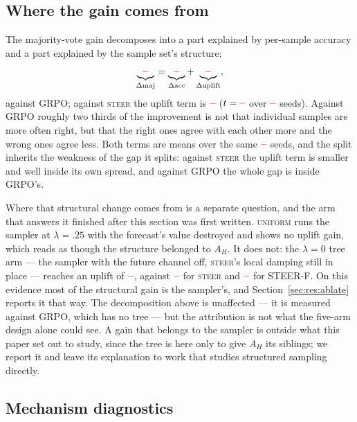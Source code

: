 \documentclass[11pt]{article}
\newcommand{\AH}{A_{H}}
\providecommand{\PENDING}{\textcolor{red}{\textbf{--}}}
\newcommand{\num}[1]{\ifcsname #1\endcsname\csname #1\endcsname\else\PENDING\fi}
\begin{document}
\subsection{Where the gain comes from}
\label{sec:res:decomp}

The majority-vote gain decomposes into a part explained by per-sample accuracy and a
part explained by the sample set's structure:
%
\begin{equation*}
\underbrace{\num{Csignedgrpomaj}}_{\Delta\mathrm{maj}}
=\underbrace{\num{Csignedgrpoacc}}_{\Delta\mathrm{acc}}
+\underbrace{\num{Csignedgrpouplift}}_{\Delta\mathrm{uplift}},
\end{equation*}
%
against GRPO; against \textsc{steer} the uplift term is
$\num{Csignedsteeruplift}$ ($t = \num{Tsignedsteeruplift}$ over
$\num{Nsignedsteer}$ seeds). Against GRPO roughly two thirds of the improvement is
not that individual samples are more often right, but that the right ones agree with
each other more and the wrong ones agree less. Both terms are
means over the same $\num{Nseedsused}$ seeds, and the split inherits the weakness of
the gap it splits: against \textsc{steer} the uplift term is smaller and well
inside its own spread, and against GRPO the whole gap is inside GRPO's.

Where that structural change comes from is a separate question, and the arm that
answers it finished after this section was first written. \textsc{uniform} runs the
sampler at $\lambda = .25$ with the forecast's value destroyed and shows no uplift
gain, which reads as though the structure belonged to $\AH$. It does not: the
$\lambda = 0$ tree arm --- the sampler with the future channel off, \textsc{steer}'s
local damping still in place --- reaches an uplift
of $\num{Rlamzerouplift}$, against $\num{Rsteeruplift}$ for \textsc{steer} and
$\num{Rsigneduplift}$ for STEER-F. On this evidence most of the structural gain is
the sampler's, and Section~\ref{sec:res:ablate} reports it that way. The
decomposition above is unaffected --- it is measured against GRPO, which has no tree
--- but the attribution is not what the five-arm design alone could see. A gain that
belongs to the sampler is outside what this paper set out to study, since the tree is
here only to give $\AH$ its siblings; we report it and leave its explanation to work
that studies structured sampling directly.

\subsection{Mechanism diagnostics}
\label{sec:res:diag}
\end{document}
